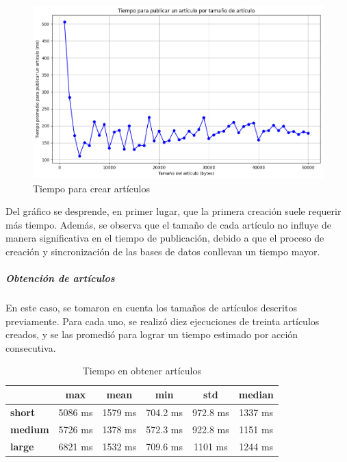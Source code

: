 \begin{figure}[H]
    \centering
    \includegraphics[width=1\linewidth]{img/metricas-ipfs/tiempo-para-crear-articulo.png}
    \caption{Tiempo para crear artículos}
    \label{fig:ipfs-create-message-graphic.png}
\end{figure}

Del gráfico se desprende, en primer lugar, que la primera creación suele requerir más tiempo. Además, se observa que el tamaño de cada artículo no influye de manera significativa en el tiempo de publicación, debido a que el proceso de creación y sincronización de las bases de datos conllevan un tiempo mayor.

\subparagraph{Obtención de artículos}

En este caso, se tomaron en cuenta los tamaños de artículos descritos previamente. Para cada uno, se realizó diez ejecuciones de treinta artículos creados, y se las promedió para lograr un tiempo estimado por acción consecutiva.

\setlength\tabcolsep{10pt}
\begin{table}[!htbp]
    \centering
    \begin{tabular}{|l|c|c|c|c|c|}
\hline
                & \textbf{max} & \textbf{mean} & \textbf{min} & \textbf{std} & \textbf{median} \\ \hline
\textbf{short}  & 5086 ms       & 1579 ms       & 704.2 ms     & 972.8 ms     & 1337 ms         \\ \hline
\textbf{medium} & 5726 ms      & 1378 ms       & 572.3 ms     & 922.8 ms     & 1151 ms         \\ \hline
\textbf{large}  & 6821 ms      & 1532 ms       & 709.6 ms     & 1101 ms      & 1244 ms         \\ \hline
\end{tabular}
    \caption{Tiempo en obtener artículos}
\end{table}  

